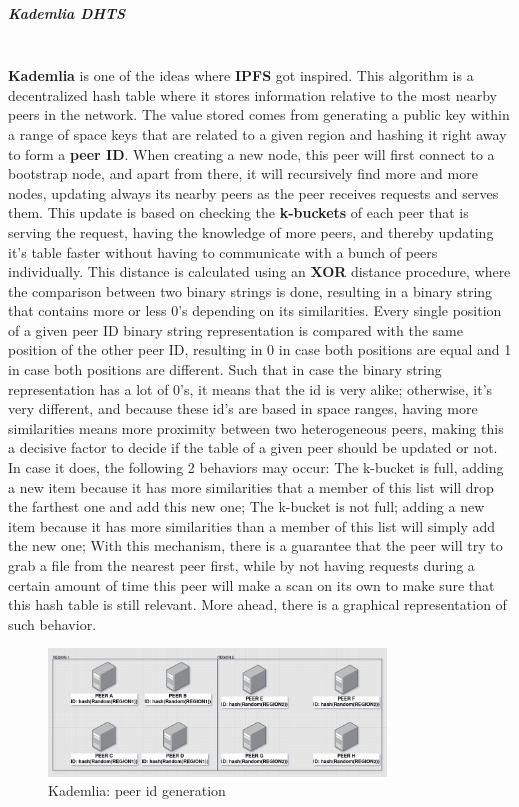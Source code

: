 \subparagraph{Kademlia DHTS}\mbox{}\\
\textbf{Kademlia} \cite{kademlia} is one of the ideas where \textbf{IPFS} got inspired. This algorithm is a decentralized hash table where it stores information relative to the most nearby peers in the network. The value stored comes from generating a public key within a range of space keys that are related to a given region and hashing it right away to form a \textbf{peer ID}. When creating a new node, this peer will first connect to a bootstrap node, and apart from there, it will recursively find more and more nodes, updating always its nearby peers as the peer receives requests and serves them. This update is based on checking the \textbf{k-buckets} of each peer that is serving the request, having the knowledge of more peers, and thereby updating it's table faster without having to communicate with a bunch of peers individually. This distance is calculated using an \textbf{XOR} distance procedure, where the comparison between two binary strings is done, resulting in a binary string that contains more or less 0's depending on its similarities. Every single position of a given peer ID binary string representation is compared with the same position of the other peer ID, resulting in 0 in case both positions are equal and 1 in case both positions are different. Such that in case the binary string representation has a lot of 0's, it means that the id is very alike; otherwise, it's very different, and because these id's are based in space ranges, having more similarities means more proximity between two heterogeneous peers, making this a decisive factor to decide if the table of a given peer should be updated or not. In case it does, the following 2 behaviors may occur: The k-bucket is full, adding a new item because it has more similarities that a member of this list will drop the farthest one and add this new one; The k-bucket is not full; adding a new item because it has more similarities than a member of this list will simply add the new one; With this mechanism, there is a guarantee that the peer will try to grab a file from the nearest peer first, while by not having requests during a certain amount of time this peer will make a scan on its own to make sure that this hash table is still relevant. More ahead, there is a graphical representation of such behavior.

\begin{figure}[H]
    \centering
    \includegraphics[width=0.8\textwidth]{assets/use-case-1/explain-kademlia.png} %
    \caption{Kademlia: peer id generation}
    \label{fig:sample-image} 
\end{figure}

